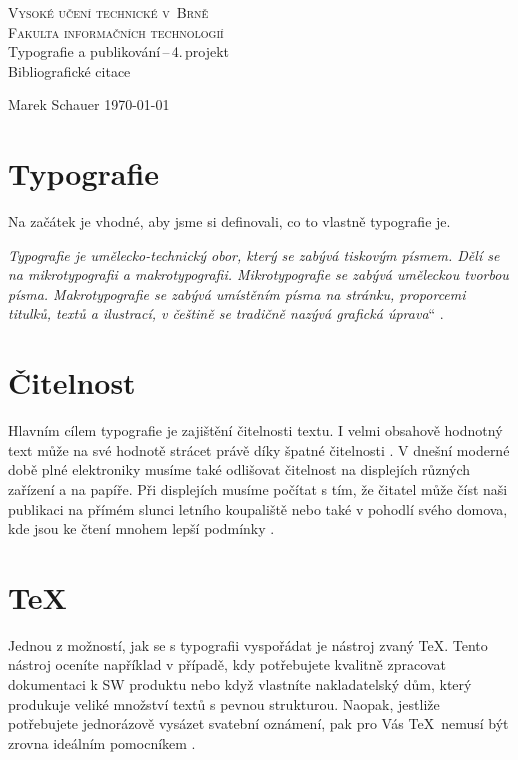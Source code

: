 \documentclass[11pt,a4paper,titlepage]{article}
\providecommand{\uv}[1]{\quotedblbase #1\textquotedblleft}
\begin{document}
\begin{titlepage}
\begin{center}
    {\LARGE\textsc{Vysoké učení technické v~Brně}}\\
    \smallskip
    {\Large\textsc{Fakulta informačních technologií}}\\
    \bigskip
    \LARGE{Typografie a publikování\,--\,4.\,projekt}\\
    \smallskip
    \Huge{Bibliografické citace}\\
\end{center}
    {\Large Marek Schauer \hfill \today }
\end{titlepage}

\section{Typografie}
Na začátek je vhodné, aby jsme si definovali, co to vlastně typografie je.

\uv{\emph{Typografie je umělecko-technický obor, který se zabývá tiskovým písmem. Dělí se na mikrotypografii a makrotypografii. Mikrotypografie se zabývá uměleckou tvorbou písma. Makrotypografie se zabývá umístěním písma na stránku, proporcemi titulků, textů a ilustrací, v češtině se tradičně nazývá grafická úprava}} \cite{Wiki:Typografie}.


\section{Čitelnost}
Hlavním cílem typografie je zajištění čitelnosti textu. I velmi obsahově hodnotný text může na své hodnotě strácet právě díky špatné čitelnosti \cite{Bringhurst:The_elements_of_typhographis_style}. V dnešní moderné době plné elektroniky musíme také odlišovat čitelnost na displejích různých zařízení a na papíře. Při displejích musíme počítat s tím, že čitatel může číst naši publikaci na přímém slunci letního koupaliště nebo také v pohodlí svého domova, kde jsou ke čtení mnohem lepší podmínky \cite{Maria:On_web_typography}.

\section{\TeX}
Jednou z možností, jak se s typografii vyspořádat je nástroj zvaný \TeX. Tento nástroj oceníte například v případě, kdy potřebujete kvalitně zpracovat dokumentaci k SW produktu nebo když vlastníte nakladatelský dům, který produkuje veliké množství textů s pevnou strukturou. Naopak, jestliže potřebujete jednorázově vysázet svatební oznámení, pak pro Vás \TeX \ nemusí být zrovna ideálním pomocníkem \cite{Sojka:Par_poznamek_pro_texove_novice}.
\end{document}
